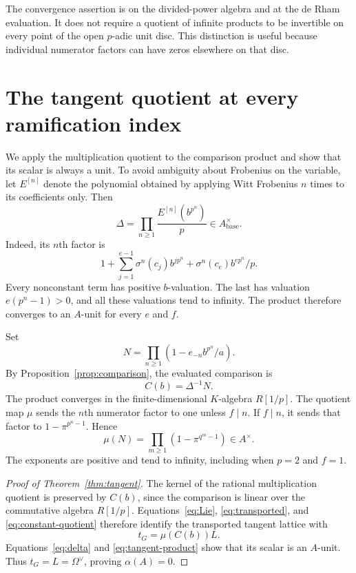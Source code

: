 \documentclass[11pt]{article}
\theoremstyle{definition}\newtheorem{definition}[theorem]{Definition}
\theoremstyle{remark}\newtheorem{remark}[theorem]{Remark}
\newcommand{\base}{\mathrm{base}}
\begin{document}
The convergence assertion is on the divided-power algebra and at the de Rham evaluation. It does not require a quotient of infinite products to be invertible on every point of the open $p$-adic unit disc. This distinction is useful because individual numerator factors can have zeros elsewhere on that disc.

\section{The tangent quotient at every ramification index}\label{sec:tangent}

We apply the multiplication quotient to the comparison product and show that its scalar is always a unit. To avoid ambiguity about Frobenius on the variable, let $E^{[n]}$ denote the polynomial obtained by applying Witt Frobenius $n$ times to its coefficients only. Then
\begin{equation}\label{eq:delta}
 \Delta=\prod_{n\ge1}\frac{E^{[n]}(b^{p^n})}{p}
       \in A_{\base}^\times.
\end{equation}
Indeed, its $n$th factor is
\begin{equation}\label{eq:delta-expand}
 1+\sum_{j=1}^{e-1}\sigma^n(c_j)b^{jp^n}
   +\sigma^n(c_e)b^{ep^n}/p.
\end{equation}
Every nonconstant term has positive $b$-valuation. The last has valuation $e(p^n-1)>0$, and all these valuations tend to infinity. The product therefore converges to an $A$-unit for every $e$ and $f$.

Set
\begin{equation}\label{eq:N}
 N=\prod_{n\ge1}(1-e_{-n}b^{p^n}/a).
\end{equation}
By Proposition~\ref{prop:comparison}, the evaluated comparison is
\begin{equation}\label{eq:C-b}
 C(b)=\Delta^{-1}N.
\end{equation}
The product converges in the finite-dimensional $K$-algebra $R[1/p]$. The quotient map $\mu$ sends the $n$th numerator factor to one unless $f\mid n$. If $f\mid n$, it sends that factor to $1-\pi^{p^n-1}$. Hence
\begin{equation}\label{eq:tangent-product}
 \mu(N)=\prod_{m\ge1}(1-\pi^{q^m-1})\in A^\times.
\end{equation}
The exponents are positive and tend to infinity, including when $p=2$ and $f=1$.

\begin{proof}[Proof of Theorem~\ref{thm:tangent}]
The kernel of the rational multiplication quotient is preserved by $C(b)$, since the comparison is linear over the commutative algebra $R[1/p]$. Equations~\eqref{eq:Lie}, \eqref{eq:transported}, and \eqref{eq:constant-quotient} therefore identify the transported tangent lattice with
\[
 t_G=\mu(C(b))L.
\]
Equations~\eqref{eq:delta} and \eqref{eq:tangent-product} show that its scalar is an $A$-unit. Thus $t_G=L=\Omega^\vee$, proving $\alpha(A)=0$.
\end{proof}
\end{document}
